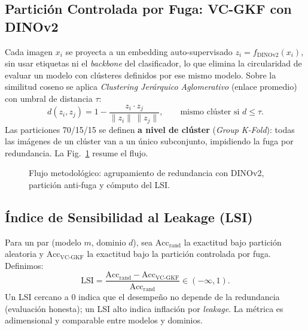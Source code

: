 \documentclass[journal,compsoc]{IEEEtran}
\begin{document}
\subsection{Partición Controlada por Fuga: VC-GKF con DINOv2}
Cada imagen $x_i$ se proyecta a un embedding auto-supervisado $z_i = f_{\text{DINOv2}}(x_i)$, sin usar etiquetas ni el \textit{backbone} del clasificador, lo que elimina la circularidad de evaluar un modelo con clústeres definidos por ese mismo modelo. Sobre la similitud coseno se aplica \textit{Clustering Jerárquico Aglomerativo} (enlace promedio) con umbral de distancia $\tau$:
\begin{equation}
d(z_i,z_j)=1-\frac{z_i\cdot z_j}{\lVert z_i\rVert\,\lVert z_j\rVert},\qquad \text{mismo clúster si } d\le\tau .
\end{equation}
Las particiones 70/15/15 se definen \textbf{a nivel de clúster} (\textit{Group K-Fold}): todas las imágenes de un clúster van a un único subconjunto, impidiendo la fuga por redundancia. La Fig.~\ref{fig:pipeline} resume el flujo.

\begin{figure}[H]
\centering
{}
\caption{Flujo metodológico: agrupamiento de redundancia con DINOv2, partición anti-fuga y cómputo del LSI.}
\label{fig:pipeline}
\end{figure}

\subsection{Índice de Sensibilidad al Leakage (LSI)}
Para un par (modelo $m$, dominio $d$), sea $\text{Acc}_{\text{rand}}$ la exactitud bajo partición aleatoria y $\text{Acc}_{\text{VC-GKF}}$ la exactitud bajo la partición controlada por fuga. Definimos:
\begin{equation}
\text{LSI} = \frac{\text{Acc}_{\text{rand}} - \text{Acc}_{\text{VC-GKF}}}{\text{Acc}_{\text{rand}}}\in(-\infty,1).
\end{equation}
Un LSI cercano a 0 indica que el desempeño no depende de la redundancia (evaluación honesta); un LSI alto indica inflación por \textit{leakage}. La métrica es adimensional y comparable entre modelos y dominios.
\end{document}

